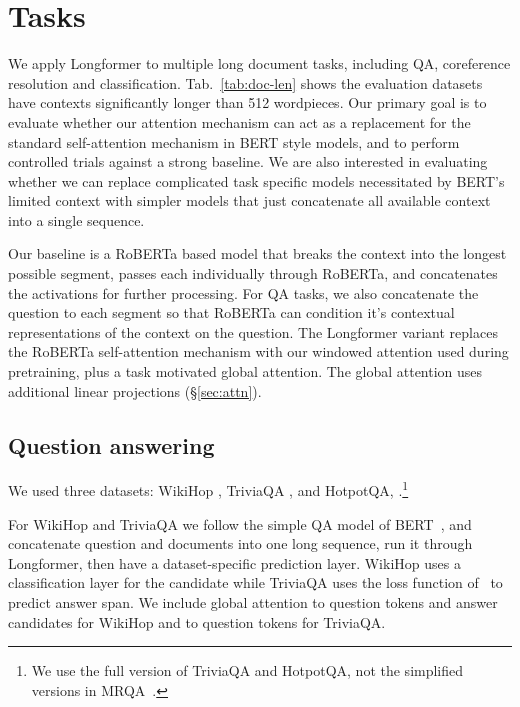 \section{Tasks}

We apply Longformer to multiple long document tasks, including QA, coreference resolution and classification.  Tab.~\ref{tab:doc-len} shows the evaluation datasets have contexts significantly longer than 512 wordpieces. Our primary goal is to evaluate whether our attention mechanism can act as a replacement for the standard self-attention mechanism in BERT style models, and to perform controlled trials against a strong baseline. We are also interested in evaluating whether we can replace complicated task specific models necessitated by BERT's limited context with simpler models that just concatenate all available context into a single sequence.

Our baseline is a RoBERTa based model that breaks the context into the longest possible segment, passes each individually through RoBERTa, and concatenates the activations for further processing. For QA tasks, we also concatenate the question to each segment so that RoBERTa can condition it's contextual representations of the context on the question. The Longformer variant replaces the RoBERTa self-attention mechanism with our windowed attention used during pretraining, plus a task motivated global attention.  The global attention uses additional linear projections (\S\ref{sec:attn}).

\subsection{Question answering}

We used three datasets: WikiHop \cite{Welbl2018ConstructingDF-Wikihop}, TriviaQA \cite[][Wikipedia setting]{Joshi2017TriviaQAAL}, and HotpotQA, \cite[][distractor setting]{Yang2018-HotpotQAAD}.\footnote{We use the full version of TriviaQA and HotpotQA, not the simplified versions in MRQA~\cite{mrqa}.} 

For WikiHop and TriviaQA we follow the simple QA model of BERT~\cite{bert}, and concatenate question and documents into one long sequence, run it through Longformer, then have a dataset-specific prediction layer. WikiHop uses a classification layer for the candidate while TriviaQA uses the loss function of~\citet{Clark2017SimpleAE} to predict answer span.  We include global attention to question tokens and answer candidates for WikiHop and to question tokens for TriviaQA.

